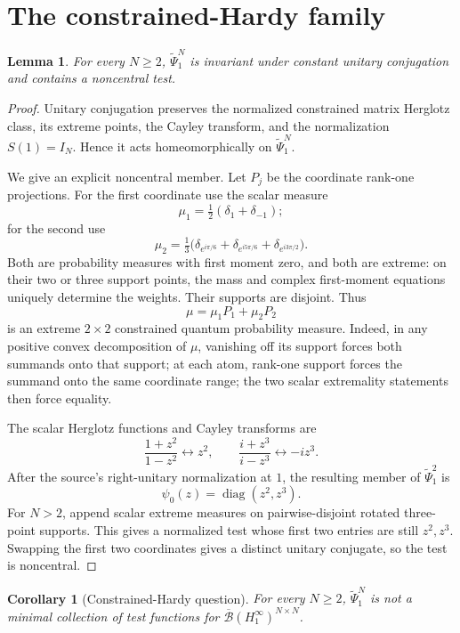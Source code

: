 \documentclass[11pt]{article}
\newtheorem{lemma}[theorem]{Lemma}
\newtheorem{corollary}[theorem]{Corollary}
\newcommand{\PsiH}{\widetilde\Psi_1^N}
\begin{document}
\section{The constrained-Hardy family}

\begin{lemma}\label{lem:noncentralH}
For every $N\ge2$, $\PsiH$ is invariant under constant unitary conjugation
and contains a noncentral test.
\end{lemma}

\begin{proof}
Unitary conjugation preserves the normalized constrained matrix Herglotz
class, its extreme points, the Cayley transform, and the normalization
$S(1)=I_N$.  Hence it acts homeomorphically on $\PsiH$.

We give an explicit noncentral member.  Let $P_j$ be the coordinate
rank-one projections.  For the first coordinate use the scalar measure
\[
 \mu_1=\tfrac12(\delta_1+\delta_{-1});
\]
for the second use
\[
 \mu_2=\tfrac13\bigl(\delta_{e^{i\pi/6}}+
 \delta_{e^{i5\pi/6}}+\delta_{e^{i3\pi/2}}\bigr).
\]
Both are probability measures with first moment zero, and both are extreme:
on their two or three support points, the mass and complex first-moment
equations uniquely determine the weights.  Their supports are disjoint.
Thus
\[
                         \mu=\mu_1P_1+\mu_2P_2
\]
is an extreme $2\times2$ constrained quantum probability measure.  Indeed,
in any positive convex decomposition of $\mu$, vanishing off its support
forces both summands onto that support; at each atom, rank-one support forces
the summand onto the same coordinate range; the two scalar extremality
statements then force equality.

The scalar Herglotz functions and Cayley transforms are
\[
 \frac{1+z^2}{1-z^2}\longleftrightarrow z^2,\qquad
 \frac{i+z^3}{i-z^3}\longleftrightarrow-i z^3.
\]
After the source's right-unitary normalization at $1$, the resulting member
of $\widetilde\Psi_1^2$ is
\[
                         \psi_0(z)=\operatorname{diag}(z^2,z^3).
\]
For $N>2$, append scalar extreme measures on pairwise-disjoint rotated
three-point supports.  This gives a normalized test whose first two entries
are still $z^2,z^3$.  Swapping the first two coordinates gives a distinct
unitary conjugate, so the test is noncentral.
\end{proof}

\begin{corollary}[Constrained-Hardy question]\label{cor:H}
For every $N\ge2$, $\PsiH$ is not a minimal collection of test functions
for $\overline{\mathcal B}(H^\infty_1)^{N\times N}$.
\end{corollary}
\end{document}
